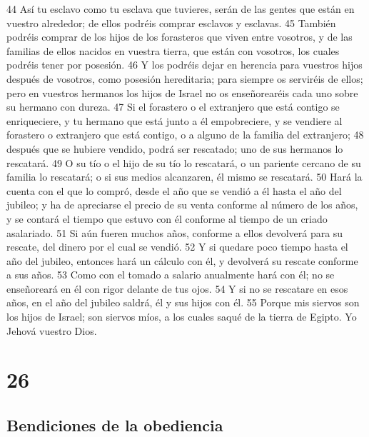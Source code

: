 44 Así tu esclavo como tu esclava que tuvieres, serán de las gentes que están en vuestro alrededor; de ellos podréis comprar esclavos y esclavas.
45 También podréis comprar de los hijos de los forasteros que viven entre vosotros, y de las familias de ellos nacidos en vuestra tierra, que están con vosotros, los cuales podréis tener por posesión.
46 Y los podréis dejar en herencia para vuestros hijos después de vosotros, como posesión hereditaria; para siempre os serviréis de ellos; pero en vuestros hermanos los hijos de Israel no os enseñorearéis cada uno sobre su hermano con dureza.
47 Si el forastero o el extranjero que está contigo se enriqueciere, y tu hermano que está junto a él empobreciere, y se vendiere al forastero o extranjero que está contigo, o a alguno de la familia del extranjero;
48 después que se hubiere vendido, podrá ser rescatado; uno de sus hermanos lo rescatará.
49 O su tío o el hijo de su tío lo rescatará, o un pariente cercano de su familia lo rescatará; o si sus medios alcanzaren, él mismo se rescatará.
50 Hará la cuenta con el que lo compró, desde el año que se vendió a él hasta el año del jubileo; y ha de apreciarse el precio de su venta conforme al número de los años, y se contará el tiempo que estuvo con él conforme al tiempo de un criado asalariado.
51 Si aún fueren muchos años, conforme a ellos devolverá para su rescate, del dinero por el cual se vendió.
52 Y si quedare poco tiempo hasta el año del jubileo, entonces hará un cálculo con él, y devolverá su rescate conforme a sus años.
53 Como con el tomado a salario anualmente hará con él; no se enseñoreará en él con rigor delante de tus ojos.
54 Y si no se rescatare en esos años, en el año del jubileo saldrá, él y sus hijos con él.
55 Porque mis siervos son los hijos de Israel; son siervos míos, a los cuales saqué de la tierra de Egipto. Yo Jehová vuestro Dios.

\chapter{26}

\section*{Bendiciones de la obediencia}

